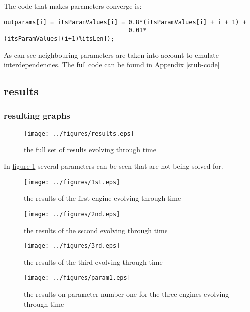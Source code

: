 \documentclass[]{lofar}
\begin{document}
        The code that makes parameters converge is:

\begin{Verbatim}[]
outparams[i] = itsParamValues[i] = 0.8*(itsParamValues[i] + i + 1) +
                                   0.01*(itsParamValues[(i+1)%itsLen]);
\end{Verbatim}

        As can see neighbouring parameters are taken into account to
        emulate interdependencies. The full code can be found in
        \hyperlink{stub-code}{Appendix {\ref*{stub-code}}}

    \subsection{results}
    \label{id2721411}\hypertarget{id2721411}{}%

      \subsubsection{resulting graphs}

      \begin{figure}
        \texttt{[image: ../figures/results.eps]}
        \label{results}\hypertarget{results}{}%
        \caption{the full set of results evolving through time}
      \end{figure}

      In \hyperlink{results}{figure \ref{results}} several parameters
      can be seen that are not being solved for.

      \begin{figure}
        \texttt{[image: ../figures/1st.eps]}
        \label{1st}\hypertarget{1st}{}%
        \caption{the results of the first engine evolving through time}
      \end{figure}

      \begin{figure}
        \texttt{[image: ../figures/2nd.eps]}
        \label{2nd}\hypertarget{2nd}{}%
        \caption{the results of the second evolving through time}
      \end{figure}

      \begin{figure}
        \texttt{[image: ../figures/3rd.eps]}
        \label{3rd}\hypertarget{3rd}{}%
        \caption{the results of the third evolving through time}
      \end{figure}

      \begin{figure}
        \texttt{[image: ../figures/param1.eps]}
        \label{param1}\hypertarget{param1}{}%
        \caption{the results on parameter number one for the three engines evolving through time}
      \end{figure}
\end{document}
